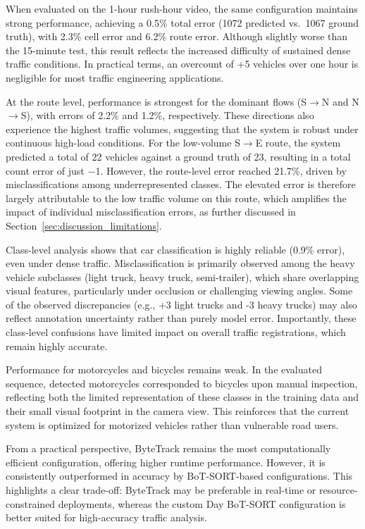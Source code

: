 When evaluated on the 1-hour rush-hour video, the same configuration maintains strong performance, achieving a 0.5\% total error (1072 predicted vs.\ 1067 ground truth), with 2.3\% cell error and 6.2\% route error. Although slightly worse than the 15-minute test, this result reflects the increased difficulty of sustained dense traffic conditions. In practical terms, an overcount of +5 vehicles over one hour is negligible for most traffic engineering applications.

At the route level, performance is strongest for the dominant flows (S$\to$N and N$\to$S), with errors of 2.2\% and 1.2\%, respectively. These directions also experience the highest traffic volumes, suggesting that the system is robust under continuous high-load conditions. For the low-volume S$\to$E route, the system predicted a total of 22 vehicles against a ground truth of 23, resulting in a total count error of just $-$1. However, the route-level error reached 21.7\%, driven by misclassifications among underrepresented classes. The elevated error is therefore largely attributable to the low traffic volume on this route, which amplifies the impact of individual misclassification errors, as further discussed in Section~\ref{sec:discussion_limitations}.

Class-level analysis shows that car classification is highly reliable (0.9\% error), even under dense traffic. Misclassification is primarily observed among the heavy vehicle subclasses (light truck, heavy truck, semi-trailer), which share overlapping visual features, particularly under occlusion or challenging viewing angles. Some of the observed discrepancies (e.g., +3 light trucks and -3 heavy trucks) may also reflect annotation uncertainty rather than purely model error. Importantly, these class-level confusions have limited impact on overall traffic registrations, which remain highly accurate.

Performance for motorcycles and bicycles remains weak. In the evaluated sequence, detected motorcycles corresponded to bicycles upon manual inspection, reflecting both the limited representation of these classes in the training data and their small visual footprint in the camera view. This reinforces that the current system is optimized for motorized vehicles rather than vulnerable road users.

From a practical perspective, ByteTrack remains the most computationally efficient configuration, offering higher runtime performance. However, it is consistently outperformed in accuracy by BoT-SORT-based configurations. This highlights a clear trade-off: ByteTrack may be preferable in real-time or resource-constrained deployments, whereas the custom Day BoT-SORT configuration is better suited for high-accuracy traffic analysis.

